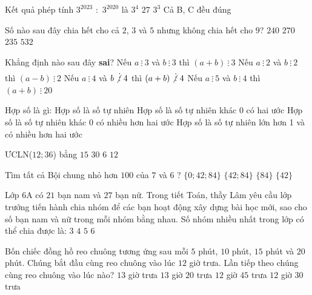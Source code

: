 	\begin{ex} %
	Kết quả phép tính $3^{2023}$ $:$ $3^{2020}$ là
	\choice
	{$3^{4}$}
	{$27$}
	{$3^{3}$}
	{\True Cả B, C đều đúng}
\end{ex}
\begin{ex}%
	Số nào sau đây chia hết cho cả $2$, $3$	và $5$ nhưng không chia hết cho $9$?
	\choice
	{\True $240$}
	{$270$}
	{$235$}
	{$532$}
\end{ex}
\begin{ex}%
	Khẳng định nào sau đây \textbf{sai}?
	\choice
	{Nếu $a\ \vdots\ 3$ và $b\ \vdots\ 3$ thì $(a+b)\ \vdots\ 3$}
	{Nếu $a\ \vdots\ 2$ và $b\ \vdots\ 2$ thì $(a-b)\ \vdots\ 2$}
	{Nếu $a\ \vdots\ 4$ và $b\not\vdots\ 4$ thì $(a+b)\not\vdots\ 4$}
	{\True Nếu $a\ \vdots\ 5$ và $b\ \vdots\ 4$ thì $(a+b)\ \vdots\ 20$}	
\end{ex}
\begin{ex} Hợp số là gì: 
	\choice
	{Hợp số là số tự nhiên}
	{Hợp số là số tự nhiên khác 0 có hai ước}
	{Hợp số là số tự nhiên khác 0 có nhiều hơn hai ước}
	{\True Hợp số là số tự nhiên lớn hơn 1 và có nhiều hơn hai ước}
\end{ex}

\begin{ex}%
	ƯCLN($12; 36$) bằng
	\choice
	{$15$}
	{$30$}
	{$6$}
	{\True $12$}
\end{ex}

\begin{ex}%
	Tìm tất cả Bội chung nhỏ hơn $ 100 $ của $ 7 $ và $ 6 $ ?
	\choice
	{\True $\{0 ; 42 ; 84\}$}
	{$\{42 ; 84\}$}
	{$\{84\}$}
	{$\{42\}$}
\end{ex}


\begin{ex}%
	Lớp 6A có $21$ bạn nam và $27$ bạn nữ. Trong tiết Toán, thầy Lâm yêu cầu lớp trưởng tiến hành chia nhóm để các bạn hoạt động xây dựng bài học mới, sao cho số bạn nam và nữ trong mỗi nhóm bằng nhau. Số nhóm nhiều nhất trong lớp có thể chia được là:
	\choice
	{\True $3$}
	{$4$}
	{$5$}
	{$6$}
\end{ex}

\begin{ex} %
	Bốn chiếc đồng hồ reo chuông tương ứng sau mỗi $5$ phút, $10$ phút, $15$ phút và $20$ phút. Chúng bắt đầu cùng reo chuông vào lúc $12$ giờ trưa. Lần tiếp theo chúng cùng reo chuông vào lúc nào?
	\choice
	{\True $13$ giờ trưa}
	{$13$ giờ $20$ trưa}
	{$12$ giờ $45$ trưa}
	{$12$ giờ $30$ trưa}
\end{ex}


